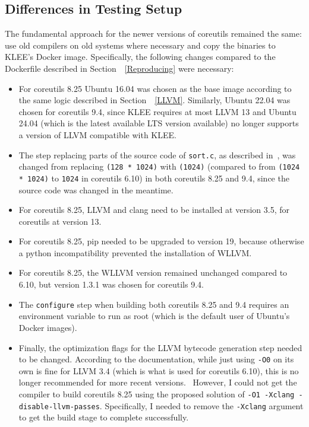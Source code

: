 \documentclass{article}
\let\savedCite=\cite
\renewcommand{\cite}{\unskip~\savedCite}
\let\savedRef=\ref
\renewcommand{\ref}{\unskip~\savedRef}
\begin{document}
\subsection{Differences in Testing Setup}

The fundamental approach for the newer versions of coreutils remained the same: use old compilers on old systems where necessary and copy the binaries to KLEE's Docker image. Specifically, the following changes compared to the Dockerfile described in Section~\ref{Reproducing} were necessary:
\begin{itemize}
    \item For coreutils 8.25 Ubuntu 16.04 was chosen as the base image according to the same logic described in Section~\ref{LLVM}. Similarly, Ubuntu 22.04 was chosen for coreutils 9.4, since KLEE requires at most LLVM 13 and Ubuntu 24.04 (which is the latest available LTS version available) no longer supports a version of LLVM compatible with KLEE.
    \item The step replacing parts of the source code of \lstinline{sort.c}, as described in\cite{KLEEFAQ}, was changed from replacing \lstinline{(128 * 1024)} with \lstinline{(1024)} (compared to from \lstinline{(1024 * 1024)} to \lstinline{1024} in coreutils 6.10) in both coreutils 8.25 and 9.4, since the source code was changed in the meantime.
    \item For coreutils 8.25, LLVM and clang need to be installed at version 3.5, for coreutils at version 13.
    \item For coreutils 8.25, pip needed to be upgraded to version 19, because otherwise a python incompatibility prevented the installation of WLLVM.
    \item For coreutils 8.25, the WLLVM version remained unchanged compared to 6.10, but version 1.3.1 was chosen for coreutils 9.4.
    \item The \lstinline{configure} step when building both coreutils 8.25 and 9.4 requires an environment variable to run as root (which is the default user of Ubuntu's Docker images).
    \item Finally, the optimization flags for the LLVM bytecode generation step needed to be changed. According to the documentation, while just using \lstinline{-O0} on its own is fine for LLVM 3.4 (which is what is used for coreutils 6.10), this is no longer recommended for more recent versions.\cite{KLEETutorial,KLEEIssue} However, I could not get the compiler to build coreutils 8.25 using the proposed solution of \lstinline{-O1 -Xclang -disable-llvm-passes}. Specifically, I needed to remove the \lstinline{-Xclang} argument to get the build stage to complete successfully.
\end{itemize}
\end{document}
